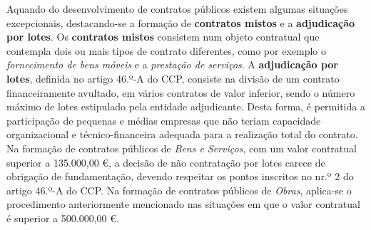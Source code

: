 Aquando do desenvolvimento de contratos públicos existem algumas situações excepcionais, destacando-se a formação de \textbf{contratos mistos} e a \textbf{adjudicação por lotes}.
Os \textbf{contratos mistos} consistem num objeto contratual que contempla dois ou mais tipos de contrato diferentes\cite{mistos}, como por exemplo o \textit{fornecimento de bens móveis} e a \textit{prestação de serviços}.
A \textbf{adjudicação por lotes}, definida no artigo 46.º-A do CCP, consiste na divisão de um contrato financeiramente avultado, em vários contratos de valor inferior, sendo o número máximo de lotes estipulado pela entidade adjudicante. Desta forma, é permitida a participação de pequenas e médias empresas que não teriam capacidade organizacional e técnico-financeira adequada para a realização total do contrato. Na formação de contratos públicos de \textit{Bens e Serviços}, com um valor contratual superior a 135.000,00 €, a decisão de não contratação por lotes carece de obrigação de fundamentação, devendo respeitar os pontos inscritos no nr.º 2 do artigo 46.º-A do CCP. Na formação de contratos públicos de \textit{Obras}, aplica-se o procedimento anteriormente mencionado nas situações em que o valor contratual é superior a 500.000,00 €. 


